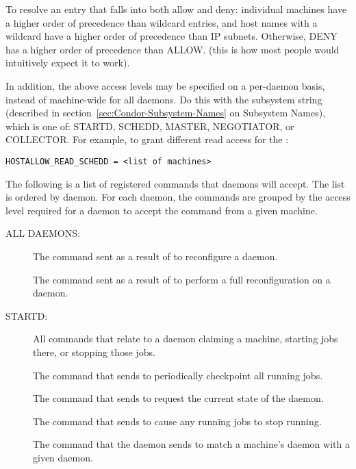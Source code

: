To resolve an entry that falls into both allow and deny:
individual
machines have a higher order of precedence than wildcard entries, and
host names with a wildcard have a higher order of precedence than IP
subnets.
Otherwise, DENY has a higher order of precedence than ALLOW.
(this is how most people would intuitively expect it to work).  

In addition, the above access levels may be specified on a
per-daemon basis, instead of machine-wide for all daemons.
Do this with the subsystem string (described in
section~\ref{sec:Condor-Subsystem-Names} on Subsystem Names),
which is one of: STARTD, SCHEDD, MASTER, NEGOTIATOR,
or COLLECTOR.
For example, to grant different read access for the :
\footnotesize
\begin{verbatim}
HOSTALLOW_READ_SCHEDD = <list of machines>
\end{verbatim}
\normalsize

The following is a list of registered commands that daemons will
accept.  The list is ordered by daemon.
For each daemon, the commands are grouped by the access level
required for a daemon to accept the command from a
given machine.

ALL DAEMONS:

\begin{description}
\item[]

  The command sent as a result of  to reconfigure a daemon.

\item[]

  The command sent as a result of 
  to perform a full reconfiguration on a daemon. 
\end{description}

STARTD:

\begin{description}
\item[] 

All commands that relate to a  daemon claiming
  a machine, starting jobs there, or stopping those jobs.

The command that  sends to periodically checkpoint
  all running jobs.

\item[]

The command that  sends to request the
  current state of the  daemon.

\item[]
The command that  sends to cause
  any running jobs to stop running.

\item[]
The command that the  daemon sends to
  match a machine's  daemon with a given 
  daemon.
\end{description}

